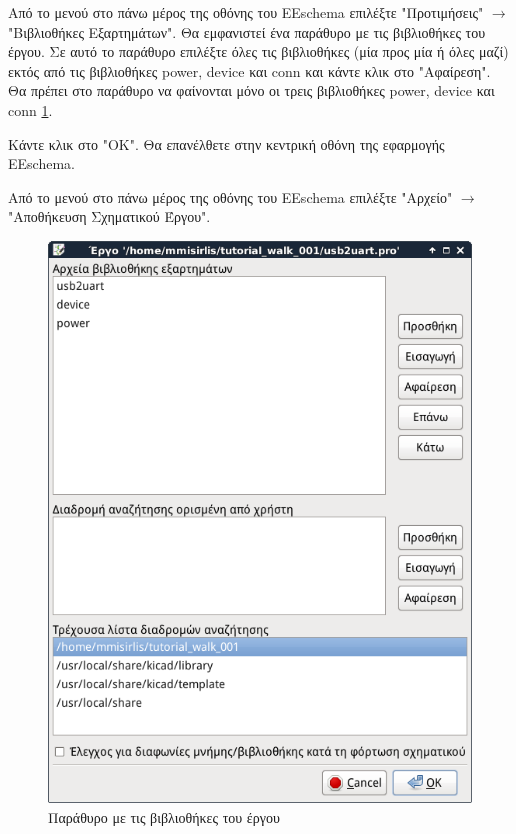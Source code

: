 \documentclass[a4paper]{article}
\begin{document}
Από το μενού στο πάνω μέρος της οθόνης του \textenglish{EEschema} επιλέξτε "Προτιμήσεις" $\rightarrow$ "Βιβλιοθήκες Εξαρτημάτων". Θα εμφανιστεί ένα παράθυρο με τις βιβλιοθήκες του έργου. Σε αυτό το παράθυρο επιλέξτε όλες τις βιβλιοθήκες (μία προς μία ή όλες μαζί) εκτός από τις βιβλιοθήκες power, device και conn και κάντε κλικ στο "Αφαίρεση". Θα πρέπει στο παράθυρο να φαίνονται μόνο οι τρεις βιβλιοθήκες power, device και conn \ref{fig:eesch-dial-libr}. 

Κάντε κλικ στο "ΟΚ". Θα επανέλθετε στην κεντρική οθόνη της εφαρμογής \textenglish{EEschema}.

Από το μενού στο πάνω μέρος της οθόνης του \textenglish{EEschema} επιλέξτε "Αρχείο" $\rightarrow$ "Αποθήκευση Σχηματικού Έργου".

\begin{figure}
  \begin{center}
    \includegraphics[width=.9\textwidth]{img/eesch-dial-libr.png}
    \caption{Παράθυρο με τις βιβλιοθήκες του έργου}
    \label{fig:eesch-dial-libr}
  \end{center}
\end{figure}
\end{document}
